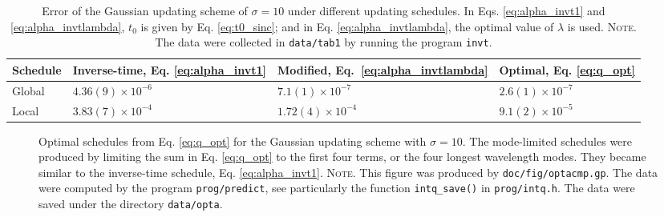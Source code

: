 \documentclass[reprint, superscriptaddress, floatfix]{revtex4-1}
\newcommand{\note}[1]{{\color{DarkGreen}\footnotesize \textsc{Note.} #1}}
\begin{document}
\begin{table}[h]\footnotesize
  \caption{\label{tab:error_Gaussian}
    Error of the Gaussian updating scheme of $\sigma = 10$
    under different updating schedules.
    In Eqs. \eqref{eq:alpha_invt1} and \eqref{eq:alpha_invtlambda},
    $t_0$ is given by Eq. \eqref{eq:t0_sinc};
    and in Eq. \eqref{eq:alpha_invtlambda},
    the optimal value of $\lambda$ is used.
    \note{\newline
      The data were collected in
      \texttt{data/tab1} by running
      the program \texttt{invt}.
    }%
  }
  \setlength{\tabcolsep}{2pt}
  \renewcommand\arraystretch{1.2}
  \begin{tabular} { l | p{2.2cm} p{2.4cm} p{2.0cm} }
    \hline
      Schedule
    &
      Inverse-time, \newline
      Eq. \eqref{eq:alpha_invt1}
    &
      Modified, \newline
      Eq.~\eqref{eq:alpha_invtlambda}
    &
      Optimal, \newline
      Eq. \eqref{eq:q_opt}
    \\
    \hline
    Global
    &
    $4.36(9) \times 10^{-6}$
    &
    $7.1(1) \times 10^{-7}$
    &
    $2.6(1) \times 10^{-7}$
    \\
    \hline
    Local
    &
    $3.83(7) \times 10^{-4}$
    &
    $1.72(4) \times 10^{-4}$
    &
    $9.1(2) \times 10^{-5}$
    \\
    \hline
  \end{tabular}
\end{table}


\begin{figure}[h]
\begin{center}
  \caption{
    \label{fig:optacmp}
    Optimal schedules from Eq. \eqref{eq:q_opt}
    for the Gaussian updating scheme
    with $\sigma = 10$.
    The mode-limited schedules were produced by
    limiting the sum in Eq. \eqref{eq:q_opt}
    to the first four terms,
    or the four longest wavelength modes.
    They became similar to the inverse-time schedule,
    Eq. \eqref{eq:alpha_invt1}.
    \note{This figure was produced by \texttt{doc/fig/optacmp.gp}.
      The data were computed by the program \texttt{prog/predict},
      see particularly the function \texttt{intq\_save()}
      in \texttt{prog/intq.h}.
      The data were saved under the directory \texttt{data/opta}.
    }%
  }
\end{center}
\end{figure}
\end{document}
